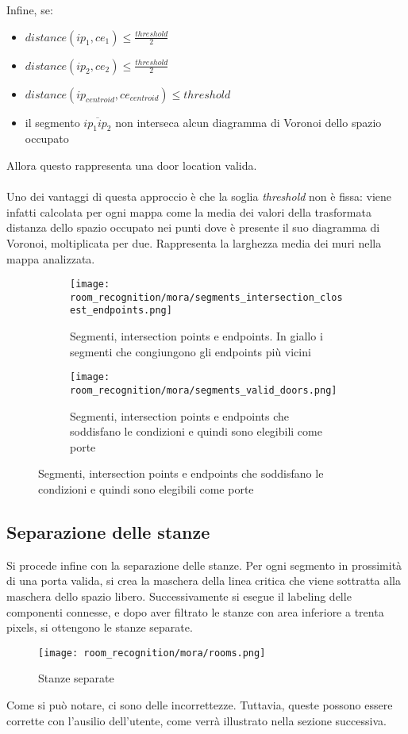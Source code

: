Infine, se:
\begin{itemize}
  \item $distance(ip_1, ce_1) \leq \frac{threshold}{2}$
  \item $distance(ip_2, ce_2) \leq \frac{threshold}{2}$
  \item $distance(ip_{centroid}, ce_{centroid}) \leq threshold$
  \item il segmento $\overline{ip_1ip_2}$ non interseca alcun diagramma di Voronoi dello spazio occupato
\end{itemize}
Allora questo rappresenta una door location valida.\\\\
Uno dei vantaggi di questa approccio è che la soglia \textit{threshold} non è fissa: viene infatti calcolata per ogni mappa come la media dei valori della trasformata distanza dello spazio occupato nei punti dove è presente il suo diagramma di Voronoi, moltiplicata per due. Rappresenta la larghezza media dei muri nella mappa analizzata.
\begin{figure}
  \centering
  \begin{subfigure}[t]{0.45\textwidth}
    \centering
    \texttt{[image: room\_recognition/mora/segments\_intersection\_closest\_endpoints.png]}
    \caption{Segmenti, intersection points e endpoints. In giallo i segmenti che congiungono gli endpoints più vicini}
  \end{subfigure}
  \begin{subfigure}[t]{0.45\textwidth}
    \centering
    \texttt{[image: room\_recognition/mora/segments\_valid\_doors.png]}
    \caption{Segmenti, intersection points e endpoints che soddisfano le condizioni e quindi sono elegibili come porte}
  \end{subfigure}
\end{figure}
\subsection{Separazione delle stanze}
Si procede infine con la separazione delle stanze. Per ogni segmento in prossimità di una porta valida, si crea la maschera della linea critica che viene sottratta alla maschera dello spazio libero. Successivamente si esegue il labeling delle componenti connesse, e dopo aver filtrato le stanze con area inferiore a trenta pixels, si ottengono le stanze separate.
\begin{figure}[H]
  \centering
  \texttt{[image: room\_recognition/mora/rooms.png]}
  \caption{Stanze separate}
\end{figure}
Come si può notare, ci sono delle incorrettezze. Tuttavia, queste possono essere corrette con l'ausilio dell'utente, come verrà illustrato nella sezione successiva.

